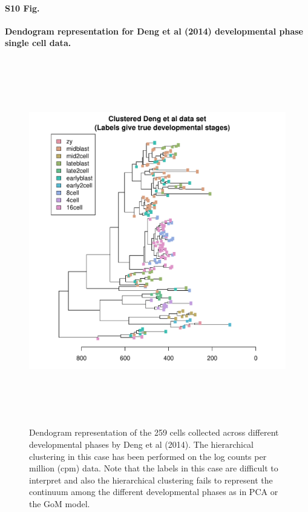 \documentclass[10pt,letterpaper]{article}
\begin{document}
\paragraph*{S10 Fig.}

\label{figS10}
{\bf Dendogram representation for Deng et al (2014) 
developmental phase single cell data.}
\begin{figure}[ht]
\centering
\includegraphics[height=6.3in, width=6in]{../../plots/dendextend_deng.pdf}
\caption{Dendogram representation of the 259 cells collected across different
developmental phases by Deng et al (2014). The hierarchical clustering in 
this case has been performed on the log counts per million (cpm) data. 
Note that the labels in this case are difficult to interpret and also the hierarchical
clustering fails to represent the continuum among the different developmental
phases as in PCA or the GoM model.}
\end{figure}
\end{document}
